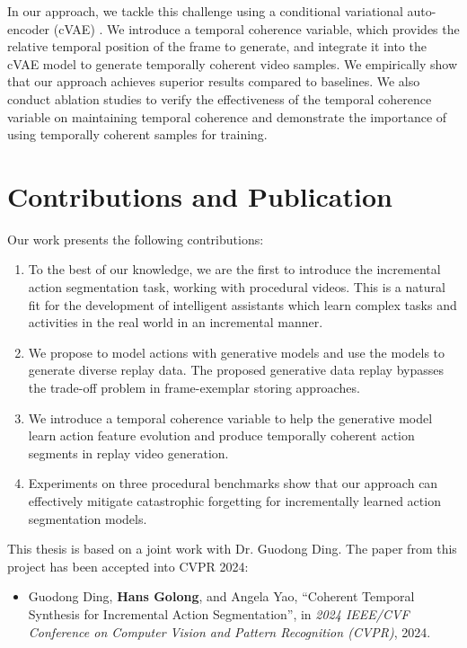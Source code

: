 In our approach, we tackle this challenge using a conditional variational auto-encoder (cVAE) \cite{sohn2015cvae}. We introduce a temporal coherence variable, which provides the relative temporal position of the frame to generate, and integrate it into the cVAE model to generate temporally coherent video samples. We empirically show that our approach achieves superior results compared to baselines. We also conduct ablation studies to verify the effectiveness of the temporal coherence variable on maintaining temporal coherence and demonstrate the importance of using temporally coherent samples for training.%


\section{Contributions and Publication}

\noindent Our work presents the following contributions:
\begin{enumerate}
    \item To the best of our knowledge, we are the first to introduce the incremental action segmentation task, working with procedural videos. This is a natural fit for the development of intelligent assistants which learn complex tasks and activities in the real world in an incremental manner.
    \item We propose to model actions with generative models and use the models to generate diverse replay data. The proposed generative data replay bypasses the trade-off problem in frame-exemplar storing approaches. 
    \item We introduce a temporal coherence variable to help the generative model learn action feature evolution and produce temporally coherent action segments in replay video generation.
    \item Experiments on three procedural benchmarks show that our approach can effectively mitigate catastrophic forgetting for incrementally learned action segmentation models. 
\end{enumerate}

\noindent This thesis is based on a joint work with Dr. Guodong Ding. The paper from this project has been accepted into CVPR 2024:
\begin{itemize}
    \item Guodong Ding, \textbf{Hans Golong}, and Angela Yao, ``Coherent Temporal Synthesis for Incremental Action Segmentation'', in \emph{2024 IEEE/CVF Conference on Computer Vision and Pattern Recognition (CVPR)}, 2024.
\end{itemize} %

